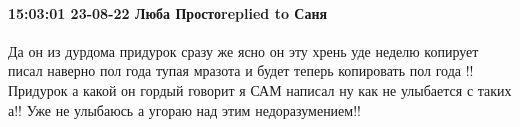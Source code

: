  
 
 
 
 

\paragraph{15:03:01 23-08-22 Люба Простоreplied to Саня}

Да он из дурдома придурок сразу же ясно он эту хрень уде неделю копирует писал
наверно пол года тупая мразота и будет теперь копировать пол года !! Придурок а
какой он гордый говорит я САМ написал ну как не улыбается с таких а!! Уже не
улыбаюсь а угораю над этим недоразумением!!

